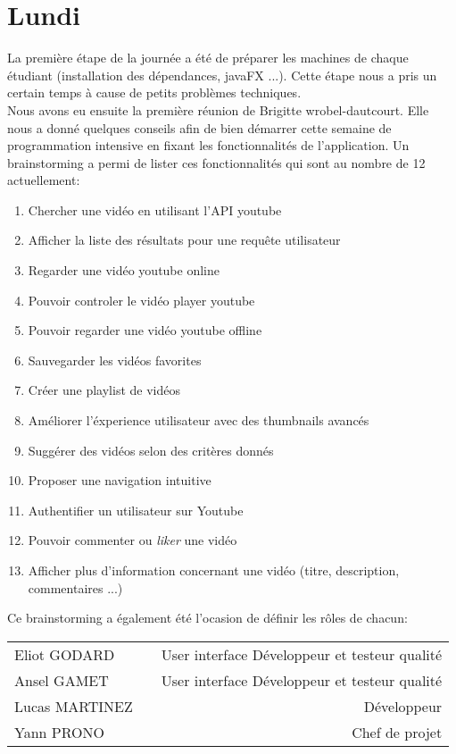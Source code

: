 \chapter{Lundi}


La première étape de la journée a été de préparer les machines de chaque étudiant (installation des dépendances, javaFX ...).
Cette étape nous a pris un certain temps à cause de petits problèmes techniques.\\

\noindent Nous avons eu ensuite la première réunion de Brigitte wrobel-dautcourt. Elle nous a donné  quelques conseils afin de bien démarrer cette semaine de programmation intensive en fixant les fonctionnalités de l'application. Un brainstorming a permi de lister ces fonctionnalités qui sont au nombre de 12 actuellement:\\

\begin{enumerate}
	\item Chercher une vidéo en utilisant l'API youtube
	\item Afficher la liste des résultats pour une requête utilisateur
	\item Regarder une vidéo youtube online
	\item Pouvoir controler le vidéo player youtube
	\item Pouvoir regarder une vidéo youtube offline
	\item Sauvegarder les vidéos favorites
	\item Créer une playlist de vidéos
	\item Améliorer l'éxperience utilisateur avec des thumbnails avancés
	\item Suggérer des vidéos selon des critères donnés
	\item Proposer une navigation intuitive
	\item Authentifier un utilisateur sur Youtube
	\item Pouvoir commenter ou \textit{liker} une vidéo
	\item Afficher plus d'information concernant une vidéo (titre, description, commentaires ...)\\
\end{enumerate}


\noindent Ce brainstorming a également été l'ocasion de définir les rôles de chacun:\\

\begin{tabular}{lcr}
	Eliot GODARD & \hspace{1cm} & User interface Développeur et testeur qualité \\
	Ansel GAMET & \hspace{1cm} & User interface Développeur et testeur qualité \\
	Lucas MARTINEZ & \hspace{1cm} & Développeur \\
	Yann PRONO & \hspace{1cm} & Chef de projet \\
\end{tabular}

